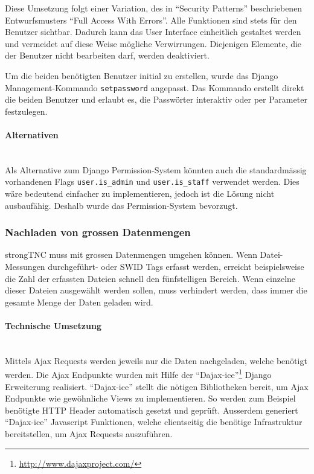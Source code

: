 Diese Umsetzung folgt einer Variation, des in \enquote{Security
Patterns}\cite{schumacher2013security} beschriebenen Entwurfsmusters \enquote{Full
Access With Errors}. Alle Funktionen sind stets für den Benutzer sichtbar.
Dadurch kann das User Interface einheitlich gestaltet werden und vermeidet auf
diese Weise mögliche Verwirrungen. Diejenigen Elemente, die der Benutzer nicht
bearbeiten darf, werden deaktiviert.

Um die beiden benötigten Benutzer initial zu erstellen, wurde das Django
Management-Kommando \texttt{setpassword} angepasst. Das Kommando erstellt direkt
die beiden Benutzer und erlaubt es, die Passwörter interaktiv oder per Parameter
festzulegen.

\paragraph{Alternativen} \hspace{0px} \\
Als Alternative zum Django Permission-System könnten auch die standardmässig
vorhandenen Flags \texttt{user.is\_admin} und \texttt{user.is\_staff} verwendet
werden. Dies wäre bedeutend einfacher zu implementieren, jedoch ist die Lösung
nicht ausbaufähig. Deshalb wurde das Permission-System bevorzugt.

\subsubsection{Nachladen von grossen Datenmengen}
strongTNC muss mit grossen Datenmengen umgehen können. Wenn Datei-Messungen
durchgeführt- oder SWID Tags erfasst werden, erreicht beispielsweise die Zahl der
erfassten Dateien schnell den fünfstelligen Bereich. Wenn einzelne dieser Dateien
ausgewählt werden sollen, muss verhindert werden, dass immer die gesamte Menge
der Daten geladen wird.

\paragraph{Technische Umsetzung} \hspace{0pt} \\
Mittels Ajax Requests werden jeweils nur die Daten nachgeladen, welche benötigt werden. 
Die Ajax Endpunkte wurden mit Hilfe der \enquote{Dajax-ice}\footnote{\url{http://www.dajaxproject.com/}} Django Erweiterung realisiert.
\enquote{Dajax-ice} stellt die nötigen Bibliotheken bereit, um Ajax Endpunkte wie gewöhnliche Views zu implementieren. So werden zum Beispiel benötigte HTTP Header
automatisch gesetzt und geprüft. Ausserdem generiert \enquote{Dajax-ice} Javascript Funktionen, welche clientseitig die benötige Infrastruktur bereitstellen, um Ajax Requests auszuführen.
\\

